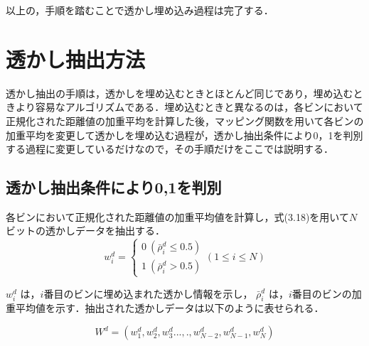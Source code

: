\documentclass[11pt]{jreport}
\begin{document}
{以上の，手順を踏むことで透かし埋め込み過程は完了する．






\newpage
\section{透かし抽出方法}
透かし抽出の手順は，透かしを埋め込むときとほとんど同じであり，埋め込むときより容易なアルゴリズムである．埋め込むときと異なるのは，各ビンにおいて正規化された距離値の加重平均を計算した後，マッピング関数を用いて各ビンの加重平均を変更して透かしを埋め込む過程が，透かし抽出条件により0，1を判別する過程に変更しているだけなので，その手順だけをここでは説明する．



\subsection{透かし抽出条件により0,1を判別}
各ビンにおいて正規化された距離値の加重平均値を計算し，式(3.18)を用いて\begin{math}N\end{math}ビットの透かしデータを抽出する．
\begin{equation}
w_i^d=
\left\{
\begin{array}{ll}
0\ (\bar{\rho}_i^d \le 0.5)\\
1\ (\bar{\rho}_i^d > 0.5)

    \end{array}
\right.
(1 \le i \le N)
\end{equation}

\begin{math}
w_i^d
\end{math}
は，\begin{math}i\end{math}番目のビンに埋め込まれた透かし情報を示し，
\begin{math}
\bar{\rho}_i^d
\end{math}
は，\begin{math}i\end{math}番目のビンの加重平均値を示す．抽出された透かしデータは以下のように表せられる．

\begin{equation}
  W^d = (w^d_1,w^d_2,w^d_3...,.,w^d_{N-2},w^d_{N-1},w^d_N) \label{exp:sample}
\end{equation}







}
\end{document}
